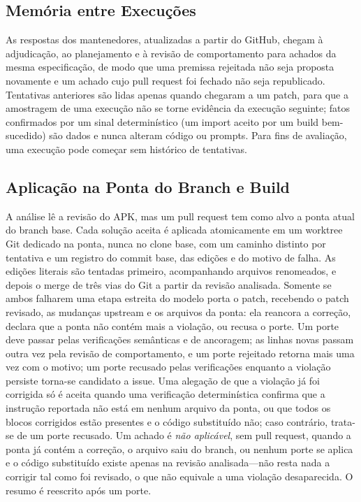 \documentclass[conference]{IEEEtran}
\begin{document}
\subsection{Memória entre Execuções}

As respostas dos mantenedores, atualizadas a partir do GitHub, chegam à
adjudicação, ao planejamento e à revisão de comportamento para achados da mesma
especificação, de modo que uma premissa rejeitada não seja proposta novamente e
um achado cujo pull request foi fechado não seja republicado. Tentativas
anteriores são lidas apenas quando chegaram a um patch, para que a amostragem
de uma execução não se torne evidência da execução seguinte; fatos confirmados
por um sinal determinístico (um import aceito por um build bem-sucedido) são
dados e nunca alteram código ou prompts. Para fins de avaliação, uma execução
pode começar sem histórico de tentativas.

\subsection{Aplicação na Ponta do Branch e Build}

A análise lê a revisão do APK, mas um pull request tem como alvo a ponta atual
do branch base. Cada solução aceita é aplicada atomicamente em um worktree Git
dedicado na ponta, nunca no clone base, com um caminho distinto por tentativa e
um registro do commit base, das edições e do motivo de falha. As edições
literais são tentadas primeiro, acompanhando arquivos renomeados, e depois o
merge de três vias do Git a partir da revisão analisada. Somente se ambos
falharem uma etapa estreita do modelo porta o patch, recebendo o patch
revisado, as mudanças upstream e os arquivos da ponta: ela reancora a correção,
declara que a ponta não contém mais a violação, ou recusa o porte. Um porte
deve passar pelas verificações semânticas e de ancoragem; as linhas novas
passam outra vez pela revisão de comportamento, e um porte rejeitado
retorna mais uma vez com o motivo; um porte recusado pelas
verificações enquanto a violação persiste torna-se candidato a issue. Uma
alegação de que a violação já foi corrigida só é aceita quando uma verificação
determinística confirma que a instrução reportada não está em nenhum arquivo da
ponta, ou que todos os blocos corrigidos estão presentes e o código substituído
não; caso contrário, trata-se de um porte recusado. Um achado é
\emph{não aplicável}, sem pull request, quando a ponta já contém a correção, o
arquivo saiu do branch, ou nenhum porte se aplica e o código
substituído existe apenas na revisão analisada---não resta nada a corrigir tal
como foi revisado, o que não equivale a uma violação desaparecida. O resumo é
reescrito após um porte.
\end{document}
